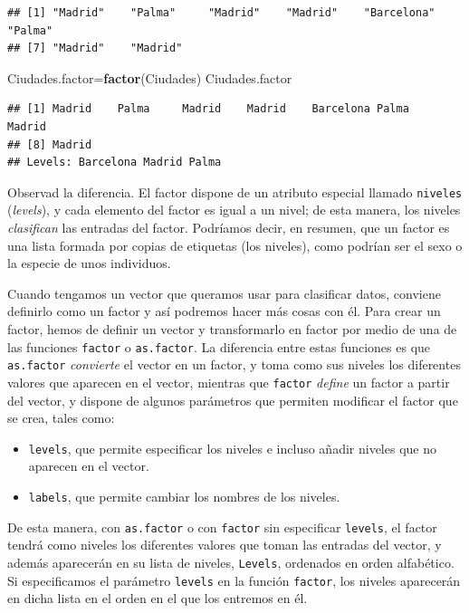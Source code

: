 \documentclass[]{book}
\newenvironment{Shaded}{\begin{snugshade}}{\end{snugshade}}
\newcommand{\KeywordTok}[1]{\textcolor[rgb]{0.13,0.29,0.53}{\textbf{#1}}}
\newcommand{\NormalTok}[1]{#1}
\providecommand{\tightlist}{%
  \setlength{\itemsep}{0pt}\setlength{\parskip}{0pt}}
\theoremstyle{definition}
\theoremstyle{definition}
\theoremstyle{definition}
\theoremstyle{remark}
\begin{document}
\begin{verbatim}
## [1] "Madrid"    "Palma"     "Madrid"    "Madrid"    "Barcelona" "Palma"    
## [7] "Madrid"    "Madrid"
\end{verbatim}

\begin{Shaded}
\begin{Highlighting}[]
\NormalTok{Ciudades.factor=}\KeywordTok{factor}\NormalTok{(Ciudades)}
\NormalTok{Ciudades.factor}
\end{Highlighting}
\end{Shaded}

\begin{verbatim}
## [1] Madrid    Palma     Madrid    Madrid    Barcelona Palma     Madrid   
## [8] Madrid   
## Levels: Barcelona Madrid Palma
\end{verbatim}

Observad la diferencia. El factor dispone de un atributo especial llamado \texttt{niveles} (\emph{levels}), y cada elemento del factor es igual a un nivel; de esta manera, los niveles \emph{clasifican} las entradas del factor.
Podríamos decir, en resumen, que un factor es una lista formada por copias de etiquetas (los niveles), como podrían ser el sexo o la especie de unos individuos.

Cuando tengamos un vector que queramos usar para clasificar datos, conviene definirlo como un factor y así podremos hacer más cosas con él. Para crear un factor, hemos de definir un vector y transformarlo en factor por medio de una de las funciones \texttt{factor} o \texttt{as.factor}. La diferencia entre estas funciones es que \texttt{as.factor} \emph{convierte} el vector en un factor, y toma como sus niveles los diferentes valores que aparecen en el vector, mientras que \texttt{factor} \emph{define} un factor a partir del vector, y dispone de algunos parámetros que permiten modificar el factor que se crea, tales como:

\begin{itemize}
\tightlist
\item
  \texttt{levels}, que permite especificar los niveles e incluso añadir niveles que no aparecen en el vector.
\item
  \texttt{labels}, que permite cambiar los nombres de los niveles.
\end{itemize}

De esta manera, con \texttt{as.factor} o con \texttt{factor} sin especificar \texttt{levels}, el factor tendrá como niveles los diferentes valores que toman las entradas del vector, y además aparecerán en su lista de niveles, \texttt{Levels}, ordenados en orden alfabético. Si especificamos el parámetro \texttt{levels} en la función \texttt{factor}, los niveles aparecerán en dicha lista en el orden en el que los entremos en él.
\end{document}
